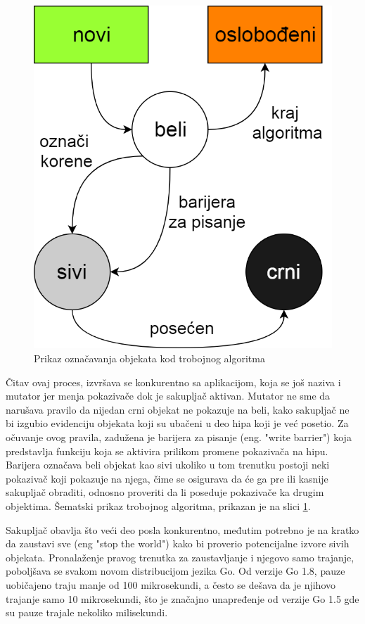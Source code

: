 \documentclass[12pt,oneside]{memoir}
\begin{document}
\begin{figure}
\begin{center}
\includegraphics[scale=0.33]{tricolor.png}
\end{center}
\caption{Prikaz označavanja objekata kod trobojnog algoritma}
\label{fig:tricolor}
\end{figure}

Čitav ovaj proces, izvršava se konkurentno sa aplikacijom, koja se još naziva i mutator jer menja pokazivače dok je sakupljač aktivan. Mutator ne sme da narušava pravilo da nijedan crni objekat ne pokazuje na beli, kako sakupljač ne bi izgubio evidenciju objekata koji su ubačeni u deo hipa koji je već posetio. Za očuvanje ovog pravila, zadužena je barijera za pisanje (eng. "write barrier") koja predstavlja funkciju koja se aktivira prilikom promene pokazivača na hipu. Barijera označava beli objekat kao sivi ukoliko u tom trenutku postoji neki pokazivač koji pokazuje na njega, čime se osigurava da će ga pre ili kasnije sakupljač obraditi, odnosno proveriti da li poseduje pokazivače ka drugim objektima. Šematski prikaz trobojnog algoritma, prikazan je na slici \ref{fig:tricolor}.

Sakupljač obavlja što veći deo posla konkurentno, međutim potrebno je na kratko da zaustavi sve (eng "stop the world") kako bi proverio potencijalne izvore sivih objekata. Pronalaženje pravog trenutka za zaustavljanje i njegovo samo trajanje, poboljšava se svakom novom distribucijom jezika Go. Od verzije Go 1.8, pauze uobičajeno traju manje od 100 mikrosekundi, a često se dešava da je njihovo trajanje samo 10 mikrosekundi, što je značajno unapređenje od verzije Go 1.5 gde su pauze trajale nekoliko milisekundi.
\end{document}
